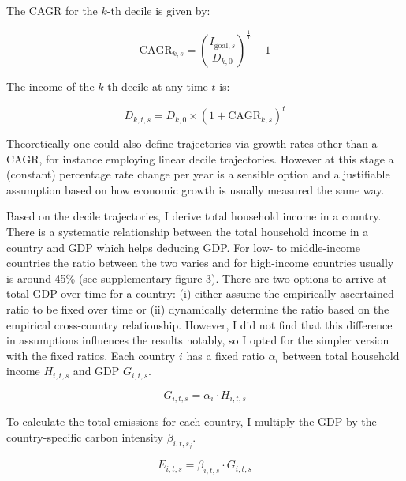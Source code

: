 \documentclass{article}
\begin{document}
The CAGR for the \( k \)-th decile is given by:

\begin{equation}
\text{CAGR}_{k, s} = \left( \frac{I_{\text{goal},s}}{D_{k,0}} \right)^{\frac{1}{T}} - 1 
\end{equation}

The income of the \( k \)-th decile at any time \( t \) is:

\begin{equation}
D_{k,t,s} = D_{k,0} \times (1 + \text{CAGR}_{k, s})^t 
\end{equation}

Theoretically one could also define trajectories via growth rates other than a CAGR, for instance employing linear decile trajectories. However at this stage a (constant) percentage rate change per year is a sensible option and a justifiable assumption based on how economic growth is usually measured the same way. 

Based on the decile trajectories, I derive total household income in a country. There is a systematic relationship between the total household income in a country and GDP which helps deducing GDP. For low- to middle-income countries the ratio between the two varies and for high-income countries usually is around 45\% (see supplementary figure 3). There are two options to arrive at total GDP over time for a country: (i) either assume the empirically ascertained ratio to be fixed over time or (ii) dynamically determine the ratio based on the empirical cross-country relationship. However, I did not find that this difference in assumptions influences the results notably, so I opted for the simpler version with the fixed ratios. 
Each country \(i\) has a fixed ratio \( \alpha_i \) between total household income \( H_{i,t,s} \) and GDP \( G_{i,t,s} \).

\begin{equation}
 G_{i,t,s} = \alpha_i \cdot H_{i,t,s} 
\end{equation}


To calculate the total emissions for each country, I multiply the GDP by the country-specific carbon intensity \( \beta_{i,t,s_j} \).

\begin{equation}
E_{i,t,s} = \beta_{i,t,s}\cdot G_{i,t,s} 
\end{equation}
\end{document}
